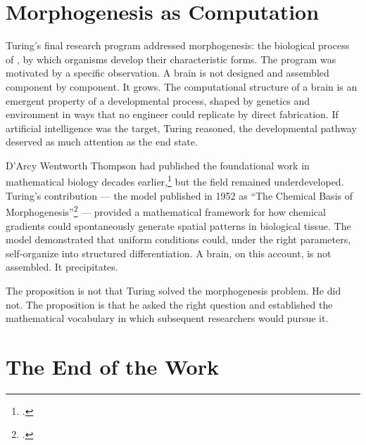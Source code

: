 \section*{Morphogenesis as Computation}

Turing's final research program addressed morphogenesis: the biological process of , by which organisms develop their characteristic forms. The program was motivated by a specific observation. A brain is not designed and assembled component by component. It grows. The computational structure of a brain is an emergent property of a developmental process, shaped by genetics and environment in ways that no engineer could replicate by direct fabrication. If artificial intelligence was the target, Turing reasoned, the developmental pathway deserved as much attention as the end state.

D'Arcy Wentworth Thompson had published the foundational work in mathematical biology decades earlier,\footcite{thompson1917} but the field remained underdeveloped. Turing's contribution --- the  model published in 1952 as ``The Chemical Basis of Morphogenesis''\footcite{turing1952} --- provided a mathematical framework for how chemical gradients could spontaneously generate spatial patterns in biological tissue. The model demonstrated that uniform conditions could, under the right parameters, self-organize into structured differentiation. A brain, on this account, is not assembled. It precipitates.

The proposition is not that Turing solved the morphogenesis problem. He did not. The proposition is that he asked the right question and established the mathematical vocabulary in which subsequent researchers would pursue it.

\section*{The End of the Work}

